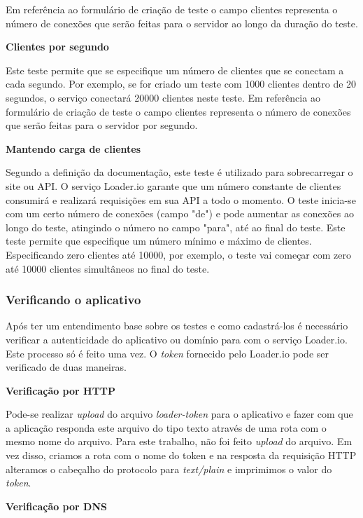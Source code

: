   Em referência ao formulário de criação de teste o campo clientes representa o número de conexões que serão
  feitas para o servidor ao longo da duração do teste.

  \textbf{Clientes por segundo}

  Este teste permite que se especifique um número de clientes que se conectam a cada segundo. Por exemplo, se for criado
  um teste com 1000 clientes dentro de 20 segundos, o serviço conectará 20000 clientes neste teste.
  Em referência ao formulário de criação de teste o campo clientes representa o número de conexões que serão
  feitas para o servidor por segundo.

  \textbf{Mantendo carga de clientes}

  Segundo a definição da documentação, este teste é utilizado para sobrecarregar o site ou \ac{API}.
  O serviço Loader.io garante que um número constante de clientes consumirá e realizará requisições em
  sua \ac{API} a todo o momento.
  O teste inicia-se com um certo número de conexões (campo "de") e pode aumentar as conexões ao longo do teste,
  atingindo o número no campo "para", até ao final do teste.
  Este teste permite que especifique um número mínimo e máximo de clientes. Especificando zero clientes
  até 10000, por exemplo, o teste vai começar com zero até 10000 clientes simultâneos no final do teste.

\subsubsection{Verificando o aplicativo}

  Após ter um entendimento base sobre os testes e como cadastrá-los é necessário verificar a autenticidade do
  aplicativo ou domínio para com o serviço Loader.io. Este processo só é feito uma vez.
  O \textit{token} fornecido pelo Loader.io pode ser verificado de duas maneiras.

  \textbf{Verificação por HTTP}

  Pode-se realizar \textit{upload} do arquivo \textit{loader-token} para o aplicativo e fazer com que a aplicação
  responda este arquivo do tipo texto através de uma rota com o mesmo nome do arquivo.
  Para este trabalho, não foi feito \textit{upload} do arquivo. Em vez disso, criamos a rota com o nome do token e
  na resposta da requisição \ac{HTTP} alteramos o cabeçalho do protocolo para \textit{text/plain} e imprimimos
  o valor do \textit{token}.

  \textbf{Verificação por DNS}

